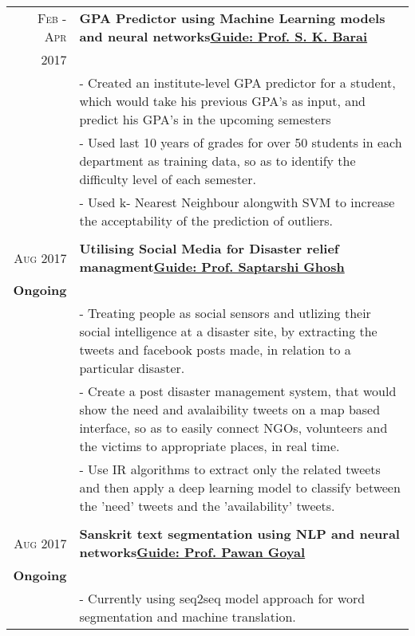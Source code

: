\documentclass[a4paper,10pt]{extarticle} %
\begin{document}
\begin{tabular}{r|p{18cm}}

\textsc{Feb - Apr} & \textbf{GPA Predictor using Machine Learning models and neural networks}\hfill\textbf{\href{http://www.facweb.iitkgp.ernet.in/~skbarai/}{Guide: Prof. S. K. Barai}}\\
\textsc{2017}\\
& \footnotesize{- Created an institute-level GPA predictor for a student, which would take his previous GPA's as input, and predict his GPA's in the upcoming semesters}\\
& \footnotesize{- Used last 10 years of grades for over 50 students in each department as training data, so as to identify the difficulty level of each semester.}\\
& \footnotesize{- Used	k- Nearest Neighbour alongwith SVM to increase the acceptability of the	prediction of outliers.}\\
\multicolumn{2}{c}{} \\
\textsc{Aug 2017} & \textbf{Utilising Social Media for Disaster relief managment}\hfill\textbf{\href{http://cse.iitkgp.ac.in/~sghosh/}{Guide: Prof. Saptarshi Ghosh}}\\
\textbf{Ongoing}\\
& \footnotesize{- Treating people as social sensors and utlizing their social intelligence at a disaster site, by extracting the tweets and facebook posts made, in relation to a particular disaster.}\\
& \footnotesize{- Create a post disaster management system, that would show the need and avalaibility tweets on a map based interface, so as to easily connect NGOs, volunteers and the victims to appropriate places, in real time.}\\
& \footnotesize{- Use IR algorithms to extract only the related tweets and then apply a deep learning model to classify between the 'need' tweets and the 'availability' tweets.}\\
\multicolumn{2}{c}{} \\
\textsc{Aug 2017} & \textbf{Sanskrit text segmentation using NLP and neural networks}\hfill\textbf{\href{http://cse.iitkgp.ac.in/~pawang/}{Guide: Prof. Pawan Goyal}}\\
\textbf{Ongoing}\\
& \footnotesize{- Currently using seq2seq model approach for word segmentation and machine translation.}\\

\end{tabular}
\end{document}
